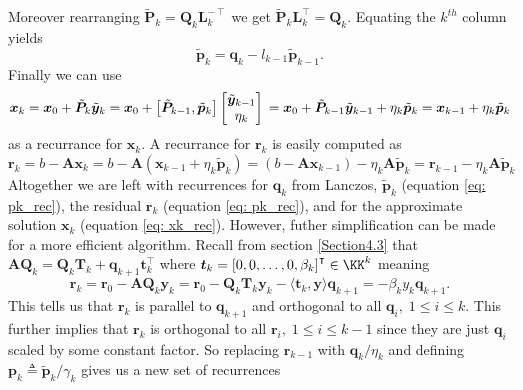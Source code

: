 Moreover rearranging $\tilde{\bm{P}}_{k} = \bm{Q}_k \bm{L}_k^{-\intercal}$ we get $\tilde{\bm{P}}_{k} \bm{L}_k^{\intercal} = \bm{Q}_k$. Equating the $k^{th}$ column yields
\begin{equation} \label{eq: pk_rec}
    \tilde{\bm{p}}_{k} = \bm{q}_k - l_{k-1} \tilde{\bm{p}}_{k-1}.
\end{equation}
Finally we can use
\begin{equation} \label{eq: xk_rec}
    \bm{x}_k = \bm{x}_0 + \tilde{\bm{P}}_{k} \tilde{\bm{y}}_{k}                                 \\
    = \bm{x}_0 + \left[ \tilde{\bm{P}}_{k-1} , \tilde{\bm{p}}_{k} \right]
    \begin{bmatrix}
        \tilde{\bm{y}}_{k-1} \\
        \eta_k
    \end{bmatrix}                                                                    \\
    = \bm{x}_0 + \tilde{\bm{P}}_{k-1} \tilde{\bm{y}}_{k-1} + \eta_k \tilde{\bm{p}}_{k} \\
    = \bm{x}_{k-1} + \eta_k \tilde{\bm{p}}_{k}
\end{equation}
as a recurrance for $\bm{x}_k$. A recurrance for $\bm{r}_k$ is easily computed as
\begin{equation} \label{eq: rk_rec}
    \bm{r}_{k} = b - \bm{A} \bm{x}_k = b - \bm{A} \left( \bm{x}_{k-1} + \eta_k \tilde{\bm{p}}_{k} \right) = \left( b - \bm{A} \bm{x}_{k-1} \right) - \eta_k \bm{A} \tilde{\bm{p}}_{k} = \bm{r}_{k-1} - \eta_k \bm{A} \tilde{\bm{p}}_{k}
\end{equation}
Altogether we are left with recurrences for $\bm{q}_k$ from Lanczos, $\tilde{\bm{p}}_{k}$ (equation \ref{eq: pk_rec}), the residual $\bm{r}_k$ (equation \ref{eq: pk_rec}),  and for the approximate solution $\bm{x}_k$ (equation \ref{eq: xk_rec}). However, futher simplification can be made for a more efficient algorithm. Recall from section \ref{Section4.3} that $\bm{A} \bm{Q}_k =  \bm{Q}_k \bm{T}_k + \bm{q}_{k+1} \bm{t}_{k}^{\intercal}$ where $\bm{t}_k = \left[ 0,0, \ldots , 0, \beta_k \right]^{\intercal} \in \KK^k$ meaning
\[
    \bm{r}_k = \bm{r}_0 - \bm{A} \bm{Q}_k \bm{y}_k = \bm{r}_0 - \bm{Q}_k \bm{T}_k \bm{y}_k - \langle \bm{t}_k , \bm{y} \rangle \bm{q}_{k+1} = - \beta_k y_k \bm{q}_{k+1}.
\]
This tells us that $\bm{r}_k$ is parallel to $\bm{q}_{k+1}$ and orthogonal to all $\bm{q}_{i}, \; 1 \leq i \leq k$. This further implies that $\bm{r}_k$ is orthogonal to all $\bm{r}_i, \; 1 \leq i \leq k-1$ since they are just $\bm{q}_{i}$ scaled by some constant factor. So replacing $\bm{r}_{k-1}$ with $\bm{q}_k / \eta_k$ and defining $\bm{p}_k \triangleq \tilde{\bm{p}}_k / \gamma_k$ gives us a new set of recurrences

